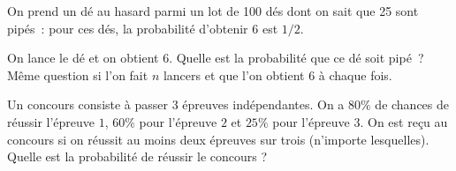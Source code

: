\documentclass{magnolia}
\begin{document}
On prend un dé au hasard parmi un lot de 100 dés dont on sait que 25
sont pipés~: pour ces dés, la probabilité d'obtenir $6$ est $1/2$.
\begin{questions}
\question On lance le dé et on obtient $6$.
  Quelle est la probabilité que ce dé soit pipé~?
\question Même question si l'on fait $n$ lancers et que l'on obtient
  $6$ à chaque fois.
\end{questions}




Un concours consiste à passer 3 épreuves indépendantes. On a $80 \%$ de chances de réussir
l'épreuve $1$, $60\%$ pour l'épreuve $2$ et $25\%$ pour l'épreuve $3$. On est reçu au
concours si on réussit au moins deux épreuves sur trois (n'importe lesquelles). Quelle est
la probabilité de réussir le concours ?

\end{document}
